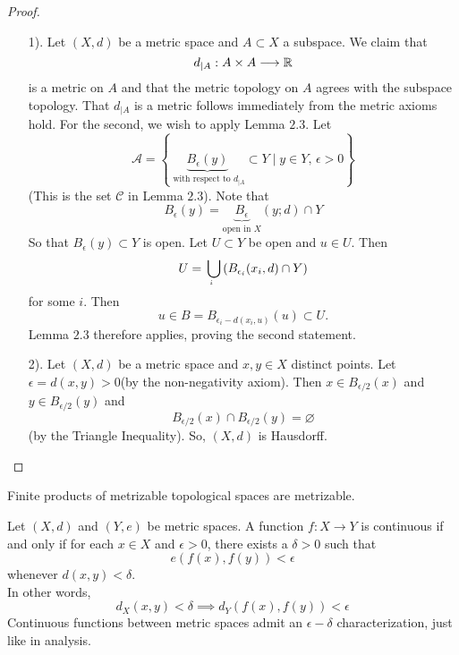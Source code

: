\begin{proof}
\begin{enumerate}
    \item[1).] Let $(X, d)$ be a metric space and $A \subset X$ a subspace. We claim that
                $$d_{\vert A}: A \times A \longrightarrow \mathbb{R}$$
                is a metric on $A$ and that the metric topology on $A$ agrees with the subspace topology. That $d_{\vert A}$ is a metric follows immediately from the metric axioms hold. For the second, we wish to apply Lemma $2.3$. Let
                $$\mathcal{A} =\left\{\underbrace{B_{\epsilon}(y)}_{\text{ with respect to $d_{\vert A}$}} \subset Y \mid y \in Y,\, \epsilon > 0\right\}$$
                (This is the set $\mathcal{C}$ in Lemma $2.3$). Note that 
                $$B_{\epsilon}(y) = \underbrace{B_{\epsilon}}_{\text{open in $X$}}\left(y;d\right) \cap Y$$
                So that $B_{\epsilon}(y) \subset Y$ is open. Let $U \subset Y$ be open and $u \in U$. Then
                $$U = \underaccent{i}{\bigcup}\left(B_{\epsilon_i}(x_i, d) \cap Y\right)$$
                for some $i$. Then 
                $$u \in B = B_{\epsilon_i - d(x_i, u)}(u) \subset U.$$
                Lemma $2.3$ therefore applies, proving the second statement.
    \item[2).] Let $(X, d)$ be a metric space and $x, y \in X$ distinct points. Let $\epsilon = d(x,y) >0$(by the non-negativity axiom). Then $x \in B_{\epsilon/2}(x)$ and $y \in B_{\epsilon/2}(y)$ and 
                $$B_{\epsilon/2}(x) \cap B_{\epsilon/2}(y) = \varnothing$$
                (by the Triangle Inequality). So, $(X,d)$ is Hausdorff.
\end{enumerate}
\end{proof}

\begin{customthm}{4.4}
Finite products of metrizable topological spaces are metrizable.
\end{customthm}

\begin{customthm}{4.5}
Let $(X, d)$ and $(Y, e)$ be metric spaces. A function $f: X \longrightarrow Y$ is continuous if and only if for each $x \in X$ and $\epsilon >0$, there exists a $\delta >0$ such that 
        $$e\left(f(x), f(y)\right) < \epsilon$$
    whenever $d(x,y) < \delta$.\\
    In other words,
        $$d_{X}(x,y) < \delta \implies d_{Y} \left(f(x), f(y)\right) < \epsilon$$
Continuous functions between metric spaces admit an $\epsilon - \delta$ characterization, just like in analysis.
\end{customthm}

